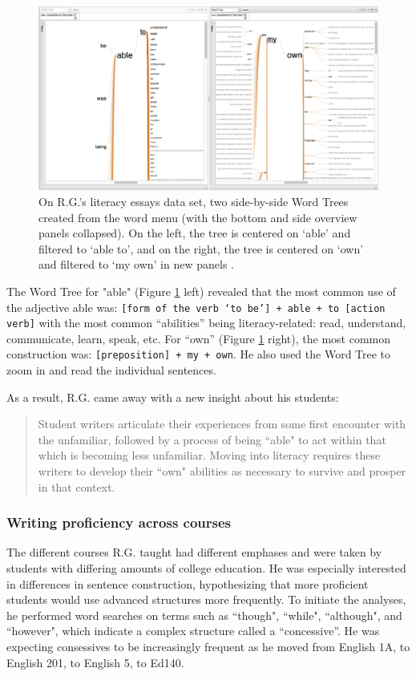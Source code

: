 \documentclass{sig-alternate}
\newcommand{\code}[1] {\texttt{#1}}
\begin{document}
\begin{figure}[h!]
\includegraphics[width=\textwidth]{fig/rex/04.png}
\caption{ On R.G.'s literacy essays data set, two side-by-side Word Trees created from the word menu (with the bottom and side overview panels collapsed). On the left, the tree is centered on `able' and filtered to `able to', and on the right, the tree is centered on  `own' and filtered to `my own' in new panels \label{fig:rex04}.}
\end{figure}

The Word Tree for "able" (Figure \ref{fig:rex04} left) revealed that the most common use of the adjective able was: \code{[form of the verb `to be'] + able + to [action verb]} with the most common ``abilities'' being literacy-related: read, understand, communicate, learn, speak, etc.  For ``own'' (Figure \ref{fig:rex04} right), the most common construction was: \code{[preposition] + my + own}.  He also used the Word Tree to zoom in and read the individual sentences.

As a result, R.G. came away with a new insight about his students:
\begin{quote}
Student writers articulate their experiences from some first encounter with the unfamiliar, followed by a process of being ``able" to act within that which is becoming less unfamiliar.  Moving into literacy requires these writers to develop their ``own" abilities as necessary to survive and prosper in that context.
\end{quote} 

\subsubsection{Writing proficiency across courses}
The different courses R.G. taught had different emphases and were taken by students with differing amounts of college education. He was especially interested in differences in sentence construction, hypothesizing that more proficient students would use advanced structures more frequently. To initiate the analyses, he performed word searches on terms such as ``though", ``while", ``although", and ``however", which indicate a complex structure called a ``concessive''. He was expecting consessives to be increasingly frequent as he moved from English 1A, to English 201, to English 5, to Ed140.
\end{document}
